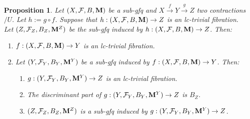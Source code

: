 \documentclass[11pt]{amsart}
\numberwithin{equation}{section}
\newcommand{\Mm}{{\bf{M}}}
\newcommand{\Ff}{\mathcal{F}}
\newtheorem{prop}[thm]{Proposition}
\theoremstyle{definition}
\theoremstyle{definition}
\theoremstyle{definition}
\begin{document}
\begin{prop}\label{prop: composition lc trivial fibration}
    Let $(X,\Ff,B,\Mm)$ be a sub-gfq and $X\xrightarrow{f}Y\xrightarrow{g}Z$ two contractions$/U$. Let $h:=g\circ f$. Suppose that $h: (X,\Ff,B,\Mm)\rightarrow Z$ is an lc-trivial fibration. Let $(Z,\Ff_Z,B_Z,\Mm^Z)$ be the sub-gfq induced by $h: (X,\Ff,B,\Mm)\rightarrow Z$. Then:
    \begin{enumerate}
        \item $f: (X,\Ff,B,\Mm)\rightarrow Y$ is an lc-trivial fibration.
        \item Let $(Y,\Ff_Y,B_Y,\Mm^Y)$ be a sub-gfq induced by $f: (X,\Ff,B,\Mm)\rightarrow Y$. Then:
        \begin{enumerate}
            \item $g: (Y,\Ff_Y,B_Y,\Mm^Y)\rightarrow Z$ is an lc-trivial fibration.
            \item The discriminant part of $g: (Y,\Ff_Y,B_Y,\Mm^Y)\rightarrow Z$ is $B_Z$.
            \item $(Z,\Ff_Z,B_Z,\Mm^Z)$ is a sub-gfq induced by  $g: (Y,\Ff_Y,B_Y,\Mm^Y)\rightarrow Z$.
        \end{enumerate}
    \end{enumerate}
\end{prop}
\end{document}
